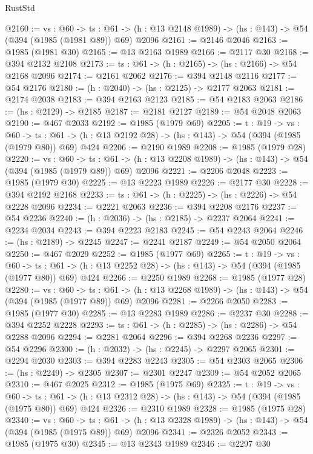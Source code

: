 \begin{lexlean}{RustStd}
\begin{coremodule}
{\begin{coremodule}
{{{{{{{{{{@2160 := {vs : @60} ->
  {ts : @61} -> (h : @13 @2148 @1989) -> (hs : @143) -> @54 (@394 (@1985 (@1981 @89)) @69) @2096
@2161 := @2146 @2046
@2163 := @1985 (@1981 @30)
@2165 := @13 @2163 @1989
@2166 := @2117 @30
@2168 := @394 @2132 @2108
@2173 := {ts : @61} -> (h : @2165) -> (hs : @2166) -> @54 @2168 @2096
@2174 := @2161 @2062
@2176 := @394 @2148 @2116
@2177 := @54 @2176
@2180 := (h : @2040) -> (hs : @2125) -> @2177 @2063
@2181 := @2174 @2038
@2183 := @394 @2163 @2123
@2185 := @54 @2183 @2063
@2186 := (hs : @2129) -> @2185
@2187 := @2181 @2127
@2189 := @54 @2048 @2063
@2190 := @467 @2033
@2192 := @1985 (@1979 @69)
@2205 := {t : @19} ->
  {vs : @60} ->
  {ts : @61} -> (h : @13 @2192 @28) -> (hs : @143) -> @54 (@394 (@1985 (@1979 @80)) @69) @424
@2206 := @2190 @1989
@2208 := @1985 (@1979 @28)
@2220 := {vs : @60} ->
  {ts : @61} -> (h : @13 @2208 @1989) -> (hs : @143) -> @54 (@394 (@1985 (@1979 @89)) @69) @2096
@2221 := @2206 @2048
@2223 := @1985 (@1979 @30)
@2225 := @13 @2223 @1989
@2226 := @2177 @30
@2228 := @394 @2192 @2168
@2233 := {ts : @61} -> (h : @2225) -> (hs : @2226) -> @54 @2228 @2096
@2234 := @2221 @2063
@2236 := @394 @2208 @2176
@2237 := @54 @2236
@2240 := (h : @2036) -> (hs : @2185) -> @2237 @2064
@2241 := @2234 @2034
@2243 := @394 @2223 @2183
@2245 := @54 @2243 @2064
@2246 := (hs : @2189) -> @2245
@2247 := @2241 @2187
@2249 := @54 @2050 @2064
@2250 := @467 @2029
@2252 := @1985 (@1977 @69)
@2265 := {t : @19} ->
  {vs : @60} ->
  {ts : @61} -> (h : @13 @2252 @28) -> (hs : @143) -> @54 (@394 (@1985 (@1977 @80)) @69) @424
@2266 := @2250 @1989
@2268 := @1985 (@1977 @28)
@2280 := {vs : @60} ->
  {ts : @61} -> (h : @13 @2268 @1989) -> (hs : @143) -> @54 (@394 (@1985 (@1977 @89)) @69) @2096
@2281 := @2266 @2050
@2283 := @1985 (@1977 @30)
@2285 := @13 @2283 @1989
@2286 := @2237 @30
@2288 := @394 @2252 @2228
@2293 := {ts : @61} -> (h : @2285) -> (hs : @2286) -> @54 @2288 @2096
@2294 := @2281 @2064
@2296 := @394 @2268 @2236
@2297 := @54 @2296
@2300 := (h : @2032) -> (hs : @2245) -> @2297 @2065
@2301 := @2294 @2030
@2303 := @394 @2283 @2243
@2305 := @54 @2303 @2065
@2306 := (hs : @2249) -> @2305
@2307 := @2301 @2247
@2309 := @54 @2052 @2065
@2310 := @467 @2025
@2312 := @1985 (@1975 @69)
@2325 := {t : @19} ->
  {vs : @60} ->
  {ts : @61} -> (h : @13 @2312 @28) -> (hs : @143) -> @54 (@394 (@1985 (@1975 @80)) @69) @424
@2326 := @2310 @1989
@2328 := @1985 (@1975 @28)
@2340 := {vs : @60} ->
  {ts : @61} -> (h : @13 @2328 @1989) -> (hs : @143) -> @54 (@394 (@1985 (@1975 @89)) @69) @2096
@2341 := @2326 @2052
@2343 := @1985 (@1975 @30)
@2345 := @13 @2343 @1989
@2346 := @2297 @30
}}}}}}}}}}
\end{coremodule}}
\end{coremodule}
\end{lexlean}
